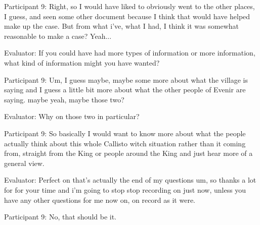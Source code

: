 \documentclass{l4proj}
\begin{document}
\begin{appendices}
Participant 9: Right, so I would have liked to obviously went to the other places, I guess, and seen some other document because I think that would have helped make up the case. But from what i've, what I had, I think it was somewhat reasonable to make a case? Yeah...

Evaluator: If you could have had more types of information or more information, what kind of information might you have wanted?

Participant 9: Um, I guess maybe, maybe some more about what the village is saying and I guess a little bit more about what the other people  of Evenir are saying. maybe yeah, maybe those two?

Evaluator: Why on those two in particular?

Participant 9: So basically I would want to know more about what the people actually think about this whole Callisto witch situation rather than it coming from, straight from the King or people around the King and just hear more of a general view.

Evaluator: Perfect on that's actually the end of my questions um, so thanks a lot for for your time and i'm going to stop stop recording on just now, unless you have any other questions for me now on, on record as it were.

Participant 9: No, that should be it. 

\end{appendices}





\renewcommand{\thechapter}{0} 

\end{document}
